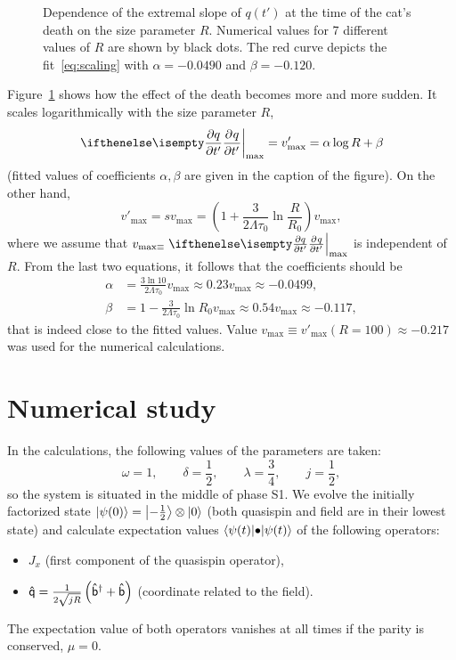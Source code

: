 \documentclass[a4paper,11pt,twoside]{article}
\begin{document}
\begin{figure}[!htbp]
	\centering{}
	\caption{Dependence of the extremal slope of $q(t')$ at the time of the cat's death on the size parameter $R$. 
	Numerical values for 7 different values of $R$ are shown by black dots. 
	The red curve depicts the fit~\eqref{eq:scaling} with $\alpha=-0.0490$ and $\beta=-0.120$.}
	\label{fig:MinScaling}
\end{figure}   

Figure~\ref{fig:MinScaling} shows how the effect of the death becomes more and more sudden.
It scales logarithmically with the size parameter $R$,
\begin{equation}
	\label{eq:scaling}
	\left.\partialderivative{q}{t'}\right|_{\mathrm{max}}=v'_{\mathrm{max}}=\alpha\log{R}+\beta
\end{equation}
(fitted values of coefficients $\alpha,\beta$ are given in the caption of the figure).
On the other hand,
\begin{equation}
	v'_{\mathrm{max}}=sv_{\mathrm{max}}=\left(1+\frac{3}{2\Lambda\tau_{0}}\ln\frac{R}{R_{0}}\right)v_{\mathrm{max}},
\end{equation}
where we assume that $v_{\mathrm{max}\equiv}\left.\partialderivative{q}{t'}\right|_{\mathrm{max}}$ is independent of $R$.
From the last two equations, it follows that the coefficients should be
\begin{align}
	\alpha&=\frac{3\ln{10}}{2\Lambda\tau_{0}}v_{\mathrm{max}}\approx0.23v_{\mathrm{max}}\approx-0.0499,\\
	\beta&=1-\frac{3}{2\Lambda\tau_{0}}\ln{R_{0}}v_{\mathrm{max}}\approx0.54v_{\mathrm{max}}\approx-0.117,
\end{align}
that is indeed close to the fitted values.
Value $v_{\mathrm{max}}\equiv v'_{\mathrm{max}}(R=100)\approx-0.217$ was used for the numerical calculations.

\section{Numerical study}
	In the calculations, the following values of the parameters are taken:
	\begin{equation}
		\label{eq:parameters}
		\omega=1,\qquad
		\delta=\frac{1}{2},\qquad
		\lambda=\frac{3}{4},\qquad
		j=\frac{1}{2},
	\end{equation}
	so the system is situated in the middle of phase S1.
	We evolve the initially factorized state $\left|{\psi(0)}\right\rangle=\left|{-\frac{1}{2}}\right\rangle\otimes\left|{0}\right\rangle$ (both quasispin and field are in their lowest state) and calculate expectation values $\left\langle{\psi(t)}\middle|{\bullet}\middle|{\psi(t)}\right\rangle$ of the following operators:
	\begin{itemize}
		\item $J_{x}$ (first component of the quasispin operator),
		\item $\mathsf{\hat{q}}=\frac{1}{2\sqrt{jR}}\left({\mathsf{\hat{b}}}^{\dagger}+\mathsf{\hat{b}}\right)$ (coordinate related to the field).
	\end{itemize}
	The expectation value of both operators vanishes at all times if the parity is conserved, \ie $\mu=0$.
\end{document}
